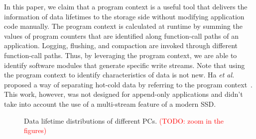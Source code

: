 In this paper, we claim that a program context is a useful tool that delivers
the information of data lifetimes to the storage side without modifying application
code manually. The program context is calculated at runtime by summing the
values of program counters that are identified along function-call paths
of an application.  Logging, flushing, and compaction are invoked through
different function-call paths.  Thus, by leveraging the program context, we are
able to identify software modules that generate specific write streams.  Note
that using the program context to identify characteristics of data is not new.
Ha \textit{et al.} proposed a way of separating hot-cold data by referring to the program
context~\cite{PCHa}. This work, however, was not designed for append-only
applications and didn't take into account the use of a multi-stream feature of
a modern SSD.

\begin{figure}[!t]
\centering
\hspace{1pt}
\hfill
\vspace{-10pt}
\caption{Data lifetime distributions of different PCs. \textcolor{red}{(TODO: zoom in the figures)}} 
\label{fig:types_and_PCs}
\vspace{-20pt}
\end{figure}

